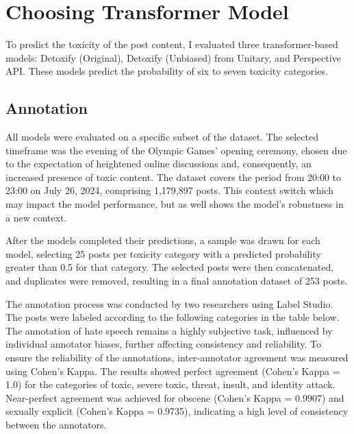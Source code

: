 \chapter{Choosing Transformer Model} \label{choosing-transformer-model}

To predict the toxicity of the post content, I evaluated three transformer-based models: Detoxify (Original), Detoxify (Unbiased) from Unitary, and Perspective API. These models predict the probability of six to seven toxicity categories.

\section{Annotation} \label{annotation}

All models were evaluated on a specific subset of the dataset. The selected timeframe was the evening of the Olympic Games' opening ceremony, chosen due to the expectation of heightened online discussions and, consequently, an increased presence of toxic content. The dataset covers the period from 20:00 to 23:00 on July 26, 2024, comprising 1,179,897 posts. This context switch which may impact the model performance, but as well shows the model's robustness in a new context.

After the models completed their predictions, a sample was drawn for each model, selecting 25 posts per toxicity category with a predicted probability greater than 0.5 for that category. The selected posts were then concatenated, and duplicates were removed, resulting in a final annotation dataset of 253 posts.

The annotation process was conducted by two researchers using Label Studio. The posts were labeled according to the following categories in the table below. The annotation of hate speech remains a highly subjective task, influenced by individual annotator biases, further affecting consistency and reliability. To ensure the reliability of the annotations, inter-annotator agreement was measured using Cohen's Kappa. The results showed perfect agreement (Cohen's Kappa = 1.0) for the categories of toxic, severe toxic, threat, insult, and identity attack. Near-perfect agreement was achieved for obscene (Cohen's Kappa = 0.9907) and sexually explicit (Cohen's Kappa = 0.9735), indicating a high level of consistency between the annotators.

